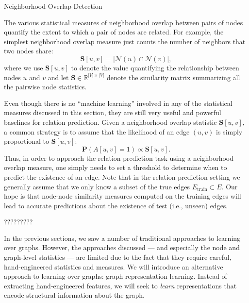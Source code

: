 \documentclass[10pt, aspectratio=169, compress, protectframetitle, handout]{beamer}
\begin{document}
\begin{frame}{Neighborhood Overlap Detection}

    The various statistical measures of neighborhood overlap between pairs of nodes quantify the extent to which a pair of nodes are related. For example, the simplest \alert{neighborhood overlap measure} just counts the number of neighbors that two nodes share:
    \begin{equation}
        \mathbf S[u, v] = |\mathcal N(u) \cap \mathcal N(v)|,
    \end{equation}
    where we use $\mathbf S[u, v]$ to denote the value quantifying the relationship between nodes $u$ and $v$ and let $\mathbf S \in \mathbb R^{|V| \times |V|}$ denote the \alert{similarity matrix} summarizing all the pairwise node statistics.
    
    Even though there is no ``machine learning'' involved in any of the statistical measures discussed in this section, they are still very useful and powerful baselines for relation prediction. Given a neighborhood overlap statistic $\mathbf S[u, v]$, a common strategy is to assume that the likelihood of an edge $(u, v)$ is simply proportional to $\mathbf S[u, v]$:
    \begin{equation}
        \mathbf P (A[u, v] = 1) \propto \mathbf S[u, v].
    \end{equation}
    Thus, in order to approach the relation prediction task using a neighborhood overlap measure, one simply needs to set a threshold to determine when to predict the existence of an edge. Note that in the relation prediction setting we generally assume that we only know a subset of the true edges $E_\text{train} \subset E$. Our hope is that \alert{node-node similarity measures} computed on the training edges will lead to accurate predictions about the existence of test (i.e., unseen) edges.
    
\end{frame}


\begin{frame}{?????????}

    In the previous sections, we saw a number of traditional approaches to learning over graphs. However, the approaches discussed --- and especially the node and graph-level statistics --- are limited due to the fact that they require careful, hand-engineered statistics and measures. We will introduce an alternative approach to learning over graphs: \alert{graph representation learning}. Instead of extracting hand-engineered features, we will seek to \emph{learn} representations that encode structural information about the graph.
    
\end{frame}
\end{document}
